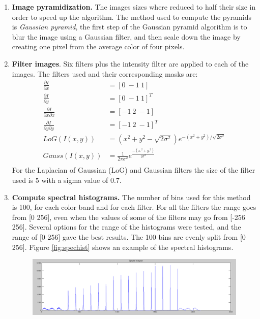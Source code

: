 \documentclass[a4paper,12pt]{article}
\begin{document}
\begin{enumerate}
    \item \textbf{Image pyramidization. } The images sizes where reduced
        to half their size in order to speed up the algorithm. The method used
        to compute the pyramids is \emph{Gaussian pyramid}, the first
        step of the Gaussian pyramid algorithm is to blur the image 
        using a Gaussian filter, and then scale down the image by 
        creating one pixel from the average color of four pixels.
    \item \textbf{Filter images}. Six filters plus the intensity
        filter are applied to each of the images. The filters 
        used and their corresponding masks are:
        \begin{equation}
            \begin{split}
                \frac{\partial I}{\partial x} & =  [0~-1~1] \\
                \frac{\partial I}{\partial y} & =  [0~-1~1]^T \\
                \frac{\partial I}{\partial x \partial x} & = [-1~2~-1] \\
                \frac{\partial I}{\partial y \partial y} & = [-1~2~-1]^T \\
                LoG(I(x,y))  & = ( x^2 + y^2 - \sqrt{2\sigma^2} ) e^{ -(x^2+y^2)/\sqrt{2\sigma^2}}\\
                Gauss(I(x,y))  & = \frac{1}{2 \pi \sigma^2} e^{ \frac{-(x.^2+y.^2)}{2\sigma^2}}\\
            \end{split}
        \end{equation}
        For the Laplacian of Gaussian (LoG) and Gaussian filters the size of the filter
        used is $5$ with a sigma value of $0.7$.
    \item \textbf{Compute spectral histograms.} The number of bins used
        for this method is 100, for each color band and for each filter. 
        For all the filters the range goes from [0 256], even when the values of some
        of the filters may go from [-256 256]. Several options for the range of the 
        histograms were tested, and the range of [0 256] gave the best results. 
        The 100 bins are evenly split from [0 256].
        Figure \ref{fig:spechist} shows an example of the spectral histograms. 
        \begin{figure}[h]
            \centering
            \includegraphics[totalheight=.18\textheight]{./Images/SpectralHist.png}

\end{figure}
\end{enumerate}
\end{document}
